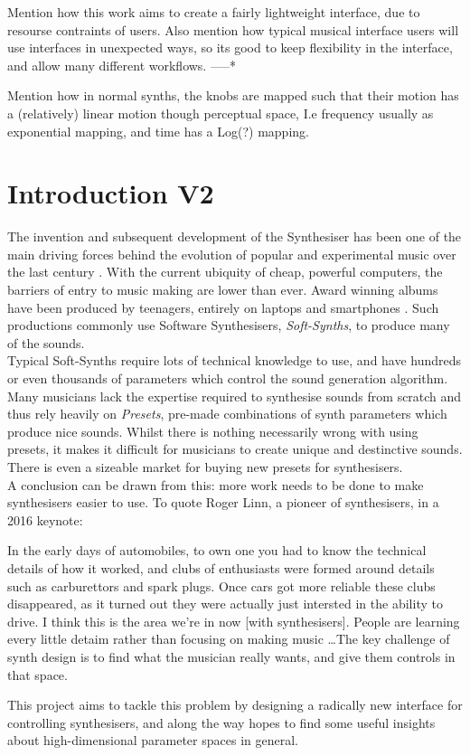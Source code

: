 \documentclass[11pt, oneside]{report}   	%
\begin{document}
Mention how this work aims to create a fairly lightweight interface, due to resourse contraints of users. Also mention how typical musical interface users will use interfaces in unexpected ways, so its good to keep flexibility in the interface, and allow many different workflows.
-----*

Mention how in normal synths, the knobs are mapped such that their motion has a (relatively) linear motion though perceptual space, I.e frequency usually as exponential mapping, and time has a Log(?) mapping.

\chapter{Introduction V2}
The invention and subsequent development of the Synthesiser has been one of the main driving forces behind the evolution of popular and experimental music over the last century \cite{DOTHIS}. With the current ubiquity of cheap, powerful computers, the barriers of entry to music making are lower than ever. Award winning albums have been produced by teenagers, entirely on laptops and smartphones \cite{DOTHIS}. Such productions commonly use Software Synthesisers, \emph{Soft-Synths}, to produce many of the sounds.\\
Typical Soft-Synths require lots of technical knowledge to use, and have hundreds or even thousands of parameters which control the sound generation algorithm. Many musicians lack the expertise required to synthesise sounds from scratch and thus rely heavily on \emph{Presets}, pre-made combinations of synth parameters which produce nice sounds. Whilst there is nothing necessarily wrong with using presets, it makes it difficult for musicians to create unique and destinctive sounds. There is even a sizeable market for buying new presets for synthesisers.\\
A conclusion can be drawn from this: more work needs to be done to make synthesisers easier to use. To quote Roger Linn, a pioneer of synthesisers, in a 2016 keynote: \cite{RogerLinn}
\begin{displayquote}
	In the early days of automobiles, to own one you had to know the technical details of how it worked, and clubs of enthusiasts were formed around details such as carburettors and spark plugs. Once cars got more reliable these clubs disappeared, as it turned out they were actually just intersted in the ability to drive. I think this is the area we're in now [with synthesisers]. People are learning every little detaim rather than focusing on making music \dots The key challenge of synth design is to find what the musician really wants, and give them controls in that space.
\end{displayquote}
This project aims to tackle this problem by designing a radically new interface for controlling synthesisers, and along the way hopes to find some useful insights about high-dimensional parameter spaces in general.
%
\end{document}
